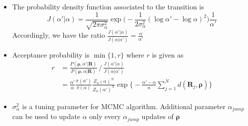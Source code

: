\documentclass[12pt]{article}
\begin{document}
\begin{itemize}
\begin{itemize}
        \item The probability density function associated to the transition is $$J(\alpha'|\alpha)=\frac{1}{\sqrt{2\pi \sigma_\alpha^2}}\exp\bigl(-\frac{1}{2\sigma_\alpha^2}(\log \alpha' -\log \alpha)^2 \bigr)\frac{1}{\alpha'}$$
        Accordingly, we have the ratio $\frac{J(\alpha'|\alpha)}{J(\alpha|\alpha')}=\frac{\alpha}{\alpha'}$ 
        \item Acceptance probability is $\min\{1, r\}$ where $r$  is given as 
        \begin{align*}
            r &= \frac{P(\boldsymbol{\rho}, \alpha' | \mathbf{R})}{P(\boldsymbol{\rho}, \alpha | \mathbf{R})} \,/\, \frac{J(\alpha'|\alpha)}{J(\alpha|\alpha')} \\ &= \frac{\alpha'}{\alpha}\frac{\pi(\alpha')}{\pi(\alpha)}\frac{Z_n(\alpha)^N}{Z_n(\alpha')^N}\exp \big\{-\frac{\alpha'-\alpha}{n}\sum_{j=1}^N d(\mathbf{R}_j, \boldsymbol{\rho})\big\}
        \end{align*}
        \item $\sigma_\alpha^2$ is a tuning parameter for MCMC algorithm. Additional parameter $\alpha_{jump}$ can be used to update $\alpha$ only every $\alpha_{jump}$ updates of $\boldsymbol{\rho}$
    \end{itemize}
\end{itemize}
\end{document}
